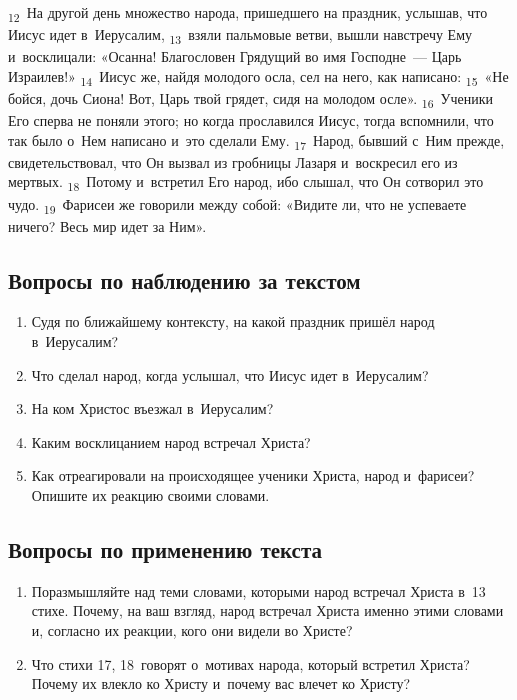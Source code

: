 \documentclass[a4paper,12pt]{article}
\begin{document}
\textsubscript{12}~На другой день множество народа, пришедшего на праздник, услышав, что Иисус идет в~Иерусалим,
\textsubscript{13}~взяли пальмовые ветви, вышли навстречу Ему и~восклицали: «Осанна! Благословен Грядущий во имя Господне~--- Царь Израилев!»
\textsubscript{14}~Иисус же, найдя молодого осла, сел на него, как написано:
\textsubscript{15}~«Не бойся, дочь Сиона! Вот, Царь твой грядет, сидя на молодом осле».
\textsubscript{16}~Ученики Его сперва не поняли этого; но когда прославился Иисус, тогда вспомнили, что так было о~Нем написано и~это сделали Ему.
\textsubscript{17}~Народ, бывший с~Ним прежде, свидетельствовал, что Он вызвал из гробницы Лазаря и~воскресил его из мертвых.
\textsubscript{18}~Потому и~встретил Его народ, ибо слышал, что Он сотворил это чудо.
\textsubscript{19}~Фарисеи же говорили между собой: «Видите ли, что не успеваете ничего? Весь мир идет за Ним».

\subsection*{Вопросы по наблюдению за текстом}
\begin{enumerate}
    \item Судя по ближайшему контексту, на какой праздник пришёл народ в~Иерусалим? 
    
    \myline
    
    \myline
    \item Что сделал народ, когда услышал, что Иисус идет в~Иерусалим? 
    
    \myline
    
    \myline
    \item На ком Христос въезжал в~Иерусалим? 
    
    \myline
    \item Каким восклицанием народ встречал Христа? 
    
    \myline
    
    \item Как отреагировали на происходящее ученики Христа, народ и~фарисеи? Опишите их реакцию своими словами. 
    
    \myline
    
    \myline
\end{enumerate}

\subsection*{Вопросы по применению текста} 
\begin{enumerate}
    \item Поразмышляйте над теми словами, которыми народ встречал Христа в~13 стихе. Почему, на ваш взгляд, народ встречал Христа именно этими словами и, согласно их реакции, кого они видели во Христе? 
    
    \myline
    
    \myline
    \item Что стихи 17, 18~говорят о~мотивах народа, который встретил Христа? Почему их влекло ко Христу и~почему вас влечет ко Христу? 
    
    \myline
    
    \myline
\end{enumerate}
\end{document}

